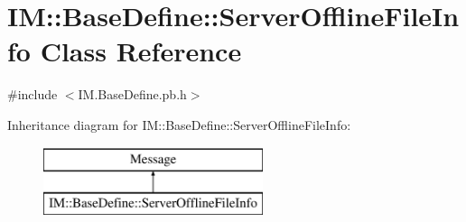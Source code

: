 \hypertarget{class_i_m_1_1_base_define_1_1_server_offline_file_info}{}\section{I\+M\+:\+:Base\+Define\+:\+:Server\+Offline\+File\+Info Class Reference}
\label{class_i_m_1_1_base_define_1_1_server_offline_file_info}


{\ttfamily \#include $<$I\+M.\+Base\+Define.\+pb.\+h$>$}

Inheritance diagram for I\+M\+:\+:Base\+Define\+:\+:Server\+Offline\+File\+Info\+:\begin{figure}[H]
\begin{center}
\leavevmode
\includegraphics[height=2.000000cm]{class_i_m_1_1_base_define_1_1_server_offline_file_info}
\end{center}
\end{figure}
